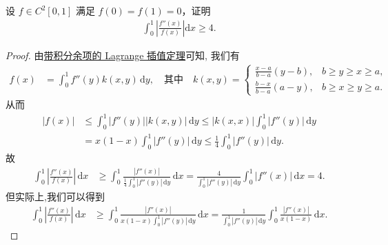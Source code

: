 \documentclass[../../main.tex]{subfiles}
\begin{document}
\begin{example}
设 $f \in C^2[0,1]$ 满足 $f(0) = f(1) = 0$，证明
\begin{align*}
\int_{0}^{1} \left| \frac{f''(x)}{f(x)} \right| \mathrm{d}x \geqslant  4.
\end{align*}
\end{example}
\begin{proof}
由\hyperref[theorem:带积分型余项的Lagrange插值公式]{带积分余项的 Lagrange 插值定理}可知, 我们有
\begin{align*}
f(x) &= \int_0^1 f''(y) k(x,y) \, \mathrm{d}y, \quad \text{其中} \quad k(x,y) = 
\begin{cases}
\frac{x-a}{b-a}(y-b), & b \ge y \ge x \ge a, \\
\frac{b-x}{b-a}(a-y), & b \ge x \ge y \ge a.
\end{cases}
\end{align*}
从而
\begin{align*}
|f(x)| &\leqslant \int_0^1 |f''(y)| |k(x,y)| \, \mathrm{d}y \leqslant |k(x,x)| \int_0^1 |f''(y)| \, \mathrm{d}y \\
&= x(1-x) \int_0^1 |f''(y)| \, \mathrm{d}y \leqslant \frac{1}{4} \int_0^1 |f''(y)| \, \mathrm{d}y.
\end{align*}
故
\begin{align*}
\int_0^1 \left| \frac{f''(x)}{f(x)} \right| \, \mathrm{d}x &\geqslant \int_0^1 \frac{|f''(x)|}{\frac{1}{4} \int_0^1 |f''(y)| \, \mathrm{d}y} \, \mathrm{d}x = \frac{4}{\int_0^1 |f''(y)| \, \mathrm{d}y} \int_0^1 |f''(x)| \, \mathrm{d}x = 4.
\end{align*}
但实际上,我们可以得到
\begin{align*}
\int_0^1 \left| \frac{f''(x)}{f(x)} \right| \, \mathrm{d}x &\geqslant \int_0^1 \frac{|f''(x)|}{x(1-x) \int_0^1 |f''(y)| \, \mathrm{d}y} \, \mathrm{d}x = \frac{1}{\int_0^1 |f''(y)| \, \mathrm{d}y} \int_0^1 \frac{|f''(x)|}{x(1-x)} \, \mathrm{d}x.
\end{align*}
\end{proof}
\end{document}
